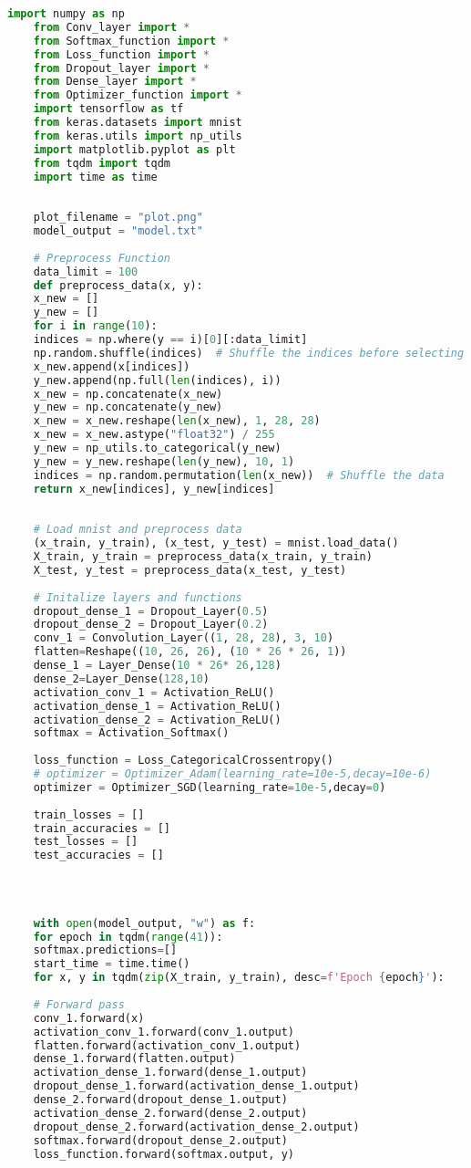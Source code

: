 \begin{lstlisting}[language=Python, caption=Model]
	import numpy as np
	from Conv_layer import *
	from Softmax_function import *
	from Loss_function import *
	from Dropout_layer import *
	from Dense_layer import *
	from Optimizer_function import *
	import tensorflow as tf
	from keras.datasets import mnist
	from keras.utils import np_utils
	import matplotlib.pyplot as plt
	from tqdm import tqdm
	import time as time
	
	
	plot_filename = "plot.png"
	model_output = "model.txt"
	
	# Preprocess Function
	data_limit = 100
	def preprocess_data(x, y):
	x_new = []
	y_new = []
	for i in range(10):
	indices = np.where(y == i)[0][:data_limit]
	np.random.shuffle(indices)  # Shuffle the indices before selecting data
	x_new.append(x[indices])
	y_new.append(np.full(len(indices), i))
	x_new = np.concatenate(x_new)
	y_new = np.concatenate(y_new)
	x_new = x_new.reshape(len(x_new), 1, 28, 28)
	x_new = x_new.astype("float32") / 255
	y_new = np_utils.to_categorical(y_new)
	y_new = y_new.reshape(len(y_new), 10, 1)
	indices = np.random.permutation(len(x_new))  # Shuffle the data
	return x_new[indices], y_new[indices]
	
	
	# Load mnist and preprocess data
	(x_train, y_train), (x_test, y_test) = mnist.load_data()
	X_train, y_train = preprocess_data(x_train, y_train)
	X_test, y_test = preprocess_data(x_test, y_test)
	
	# Initalize layers and functions
	dropout_dense_1 = Dropout_Layer(0.5)
	dropout_dense_2 = Dropout_Layer(0.2)
	conv_1 = Convolution_Layer((1, 28, 28), 3, 10)
	flatten=Reshape((10, 26, 26), (10 * 26 * 26, 1))
	dense_1 = Layer_Dense(10 * 26* 26,128)
	dense_2=Layer_Dense(128,10)
	activation_conv_1 = Activation_ReLU()
	activation_dense_1 = Activation_ReLU()
	activation_dense_2 = Activation_ReLU()
	softmax = Activation_Softmax()
	
	loss_function = Loss_CategoricalCrossentropy()
	# optimizer = Optimizer_Adam(learning_rate=10e-5,decay=10e-6)
	optimizer = Optimizer_SGD(learning_rate=10e-5,decay=0)
	
	train_losses = []
	train_accuracies = []
	test_losses = []
	test_accuracies = []
	
	
	
	
	with open(model_output, "w") as f:
	for epoch in tqdm(range(41)):
	softmax.predictions=[]
	start_time = time.time()
	for x, y in tqdm(zip(X_train, y_train), desc=f'Epoch {epoch}'):
	
	# Forward pass
	conv_1.forward(x)
	activation_conv_1.forward(conv_1.output)
	flatten.forward(activation_conv_1.output)
	dense_1.forward(flatten.output)
	activation_dense_1.forward(dense_1.output)
	dropout_dense_1.forward(activation_dense_1.output)
	dense_2.forward(dropout_dense_1.output)
	activation_dense_2.forward(dense_2.output)
	dropout_dense_2.forward(activation_dense_2.output)
	softmax.forward(dropout_dense_2.output)
	loss_function.forward(softmax.output, y)
	

\end{lstlisting}
